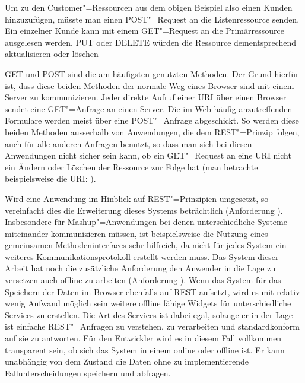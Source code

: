 Um zu den Customer"=Ressourcen aus dem obigen Beispiel also einen Kunden hinzuzufügen, müsste man einen POST"=Request an die Listenressource  senden. Ein einzelner Kunde kann mit einem GET"=Request an die Primärressource  ausgelesen werden. PUT oder DELETE würden die Ressource dementsprechend aktualisieren oder löschen

GET und POST sind die am häufigsten genutzten Methoden. Der Grund hierfür ist, dass diese beiden Methoden der normale Weg eines Browser sind mit einem Server zu kommunizieren. Jeder direkte Aufruf einer URI über einen Browser sendet eine GET"=Anfrage an einen Server. Die im Web häufig anzutreffenden Formulare werden meist über eine POST"=Anfrage abgeschickt. So werden diese beiden Methoden ausserhalb von Anwendungen, die dem REST"=Prinzip folgen, auch für alle anderen Anfragen benutzt, so dass man sich bei diesen Anwendungen nicht sicher sein kann, ob ein GET"=Request an eine URI nicht ein Ändern oder Löschen der Ressource zur Folge hat (man betrachte beispielsweise die URI: ).

Wird eine Anwendung im Hinblick auf REST"=Prinzipien umgesetzt, so vereinfacht dies die Erweiterung dieses Systems beträchtlich (Anforderung ). Insbesondere für Mashup"=Anwendungen bei denen unterschiedliche Systeme miteinander kommunizieren müssen, ist beispielsweise die Nutzung eines gemeinsamen Methodeninterfaces sehr hilfreich, da nicht für jedes System ein weiteres Kommunikationsprotokoll erstellt werden muss. Das System dieser Arbeit hat noch die zusätzliche Anforderung den Anwender in die Lage zu versetzen auch offline zu arbeiten (Anforderung ). Wenn das System für das Speichern der Daten im Browser ebenfalls auf REST aufsetzt, wird es mit relativ wenig Aufwand möglich sein weitere offline fähige Widgets für unterschiedliche Services zu erstellen. Die Art des Services ist dabei egal, solange er in der Lage ist einfache REST"=Anfragen zu verstehen, zu verarbeiten und standardkonform auf sie zu antworten. Für den Entwickler wird es in diesem Fall vollkommen transparent sein, ob sich das System in einem online oder offline ist. Er kann unabhängig von dem Zustand die Daten ohne zu implementierende Fallunterscheidungen speichern und abfragen.

